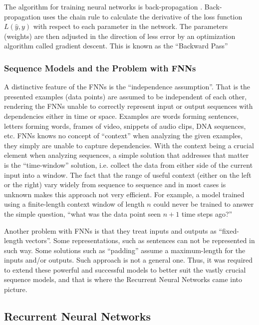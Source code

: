 The algorithm for training neural networks is back-propagation \cite{rumelhart1985learning}. Back-propagation uses the chain rule to calculate the derivative of the loss function $L(\widehat{y}, y)$ with respect to each parameter in the network. The parameters (weights) are then adjusted in the direction of less error by an optimization algorithm called gradient descent. This is known as the \enquote{Backward Pass}

\subsubsection{Sequence Models and the Problem with FNNs}\label{bg:subsub1}

A distinctive feature of the \ac{FNNs} is the \enquote{independence assumption}. That is the presented examples (data points) are assumed to be independent of each other, rendering the \ac{FNNs} unable to correctly represent input or output sequences with dependencies either in time or space. Examples are words forming sentences, letters forming words, frames of video, snippets of audio clips, DNA sequences, etc. \ac{FNNs} knows no concept of “context” when analyzing the given examples, they simply are unable to capture dependencies. With the context being a crucial element when analyzing sequences, a simple solution that addresses that matter is the \enquote{time-window} solution, i.e. collect the data from either side of the current input into a window. The fact that the range of useful context (either on the left or the right) vary widely from sequence to sequence and in most cases is unknown makes this approach not very efficient.
For example, a model trained using a finite-length context window of length $n$ could never be trained to answer the simple question, \enquote{what was the data point seen $n+\mathrm{1}$ time steps ago?}


Another problem with \ac{FNNs} is that they treat inputs and outputs as \enquote{fixed-length vectors}. Some representations, such as sentences can not be represented in such way. Some  solutions such as \enquote{padding} assume a maximum-length for the inputs and/or outputs. Such approach is not a general one. 
Thus, it was required to extend these powerful and successful models to better suit the vastly crucial sequence models, and that is where the Recurrent Neural Networks came into picture.


\subsection{Recurrent Neural Networks} 
\label{bg:sub2}


